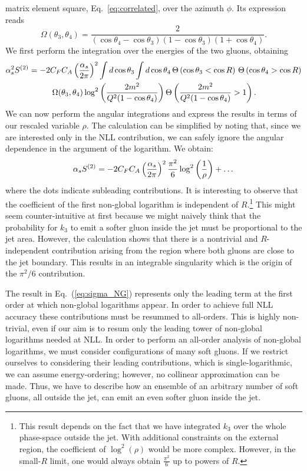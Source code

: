 matrix element square, Eq.~\eqref{eq:correlated}, over the azimuth
$\phi$. Its expression reads~\cite{Dasgupta:2001sh}
\begin{equation}
\Omega(\theta_3,\theta_4) = \frac{2}{\left(\cos\theta_4-\cos\theta_3 \right) \left(1-\cos\theta_3\right) \left(1+\cos \theta_4 \right)}.
\end{equation}
We first perform the integration over the energies of the two gluons, obtaining 
\begin{multline}
\alpha_s^2 S^{(2)} = - 2 C_F C_A \left ( \frac{\alpha_s}{2\pi} \right)^2 
\int d\cos\theta_3 \int d\cos\theta_4  
\, \Theta\left( \cos \theta_3< \cos R\right)
\, \Theta \left(\cos \theta_4>\cos R \right)
\\
\, \Omega(\theta_3,\theta_4)\log^2\left(\frac{2m^2}{Q^2(1-\cos\theta_4)}\right) \Theta\left( \frac{2m^2}{Q^2(1-\cos\theta_4)}>1\right).
\end{multline}
We can now perform the angular integrations and express the results in
terms of our rescaled variable $\rho$. The calculation can be
simplified by noting that, since we are interested only in the NLL
contribution, we can safely ignore the angular dependence in the
argument of the logarithm.
%
We obtain:
\begin{equation}
\label{eq:sigma_NG}
\alpha_s S^{(2)} = -2C_F C_A \left (\frac{\alpha_s}{2\pi}\right)^2  \frac{\pi^2}{6}\log^2\left(\frac{1}{\rho}\right) + \dots
\end{equation}
where the dots indicate subleading contributions.  It is interesting
to observe that the coefficient of the first non-global logarithm is
independent of $R$.\footnote{This result depends on the fact that we
  have integrated $k_3$ over the whole phase-space outside the
  jet. With additional constraints on the external region, the
  coefficient of $\log^2(\rho)$ would be more complex. However, in the
  small-$R$ limit, one would always obtain $\tfrac{\pi^2}{6}$ up to
  powers of $R$.}
%
This might seem counter-intuitive at first because we might naively think that the probability for $k_3$ to emit a softer gluon inside the jet must be proportional to the jet area. However, the calculation shows that there is a nontrivial and $R$-independent contribution arising from the region where both gluons are close to the jet boundary. This results in an integrable singularity which is the origin of the $\pi^2/6$ contribution.

The result in Eq.~(\ref{eq:sigma_NG}) represents only the leading term
at the first order at which non-global logarithms appear. In order to
achieve full NLL accuracy these contributions must be resummed to
all-orders. This is highly non-trivial, even if our aim is to resum
only the leading tower of non-global logarithms needed at NLL.
%
In order to perform an all-order analysis of non-global logarithms, we must consider configurations of many soft gluons. If we restrict ourselves to considering their leading contributions, which is single-logarithmic, we can assume energy-ordering; however, no collinear approximation can be made. Thus, we have to describe how an ensemble of an arbitrary number of soft gluons, all outside the jet, can emit an even softer gluon inside the jet. 


